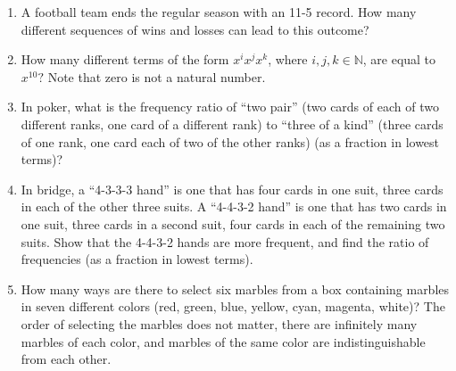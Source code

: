 \documentclass[12pt]{article}
\begin{document}
\begin{enumerate}

\item A football team ends the regular season with an 11-5 record. How many different sequences of wins and losses can lead to this outcome?



\item How many different terms of the form $x^ix^jx^k$, where $i,j,k\in \mathbb{N}$, are equal to $x^{10}?$ Note that zero is not a natural number. 



\item  In poker, what is the frequency ratio of ``two pair'' (two cards of each of two different ranks, one card of a different rank) to ``three of a kind'' (three cards of one rank, one card each of two of the other ranks) (as a fraction in lowest terms)?



\item In bridge, a ``4-3-3-3 hand'' is one that has four cards in one suit, three cards in each of the other three suits.
 A ``4-4-3-2 hand'' is one that has two cards in one suit, three cards in a second suit, four cards in each of the remaining two suits.
Show that the 4-4-3-2 hands are more frequent, and find the ratio of frequencies (as a fraction in lowest terms).

\item How many ways are there to select six marbles from a box containing marbles in seven different colors (red, green, blue, yellow, cyan, magenta, white)? The order of selecting the marbles does not matter, there are infinitely many marbles of each color, and marbles of the same color are indistinguishable from each other.  

\end{enumerate}

\pagebreak
\end{document}
